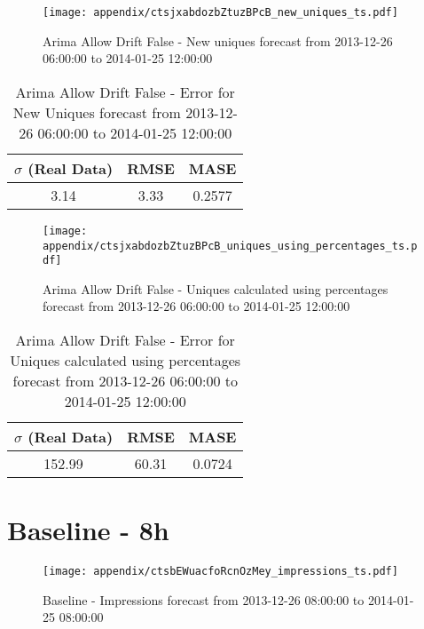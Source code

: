\begin{figure}[H] \begin{center} \leavevmode
\texttt{[image: appendix/ctsjxabdozbZtuzBPcB\_new\_uniques\_ts.pdf]} \caption[]{
Arima Allow Drift False - New uniques forecast from 2013-12-26 06:00:00 to 2014-01-25 12:00:00} \label{fig:appendix/ctsjxabdozbZtuzBPcB_new_uniques_ts.pdf} \end{center}
\end{figure}

\begin{table}[H]
\centering
\footnotesize
\begin{tabular}{ccc}
$\sigma$ (Real Data) & RMSE & MASE   \\ \hline
3.14 & 3.33 & 0.2577 \\
\end{tabular}

\vspace{0.5cm}

\caption[]{
Arima Allow Drift False - Error for New Uniques forecast from 2013-12-26 06:00:00 to 2014-01-25 12:00:00}
\end{table}

\begin{figure}[H] \begin{center} \leavevmode
\texttt{[image: appendix/ctsjxabdozbZtuzBPcB\_uniques\_using\_percentages\_ts.pdf]} \caption[]{
Arima Allow Drift False - Uniques calculated using percentages forecast from 2013-12-26 06:00:00 to 2014-01-25 12:00:00} \label{fig:appendix/ctsjxabdozbZtuzBPcB_uniques_using_percentages_ts.pdf} \end{center}
\end{figure}

\begin{table}[H]
\centering
\footnotesize
\begin{tabular}{ccc}
$\sigma$ (Real Data) & RMSE & MASE   \\ \hline
152.99 & 60.31 & 0.0724 \\
\end{tabular}

\vspace{0.5cm}

\caption[]{
Arima Allow Drift False - Error for Uniques calculated using percentages forecast from 2013-12-26 06:00:00 to 2014-01-25 12:00:00}
\end{table}

\section{Baseline - 8h}
\begin{figure}[H] \begin{center} \leavevmode
\texttt{[image: appendix/ctsbEWuacfoRcnOzMey\_impressions\_ts.pdf]} \caption[]{
Baseline - Impressions forecast from 2013-12-26 08:00:00 to 2014-01-25 08:00:00} \label{fig:appendix/ctsbEWuacfoRcnOzMey_impressions_ts.pdf} \end{center}
\end{figure}


